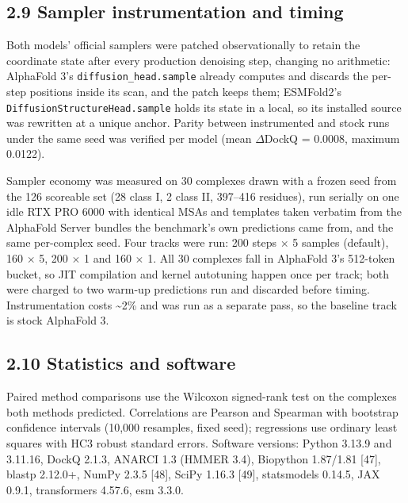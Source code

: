 \documentclass[
  11pt,
]{article}
\begin{document}
\subsection{2.9 Sampler instrumentation and
timing}\label{sampler-instrumentation-and-timing}

Both models' official samplers were patched observationally to retain
the coordinate state after every production denoising step, changing no
arithmetic: AlphaFold 3's \texttt{diffusion\_head.sample} already
computes and discards the per-step positions inside its scan, and the
patch keeps them; ESMFold2's \texttt{DiffusionStructureHead.sample}
holds its state in a local, so its installed source was rewritten at a
unique anchor. Parity between instrumented and stock runs under the same
seed was verified per model (mean \textbar \ensuremath{\Delta}DockQ\textbar{} = 0.0008,
maximum 0.0122).

Sampler economy was measured on 30 complexes drawn with a frozen seed
from the 126 scoreable set (28 class I, 2 class II, 397--416 residues),
run serially on one idle RTX PRO 6000 with identical MSAs and templates
taken verbatim from the AlphaFold Server bundles the benchmark's own
predictions came from, and the same per-complex seed. Four tracks were
run: 200 steps \ensuremath{\times} 5 samples (default), 160 \ensuremath{\times} 5, 200 \ensuremath{\times} 1 and 160 \ensuremath{\times} 1. All
30 complexes fall in AlphaFold 3's 512-token bucket, so JIT compilation
and kernel autotuning happen once per track; both were charged to two
warm-up predictions run and discarded before timing. Instrumentation
costs \textasciitilde2\% and was run as a separate pass, so the baseline
track is stock AlphaFold 3.

\subsection{2.10 Statistics and software}\label{statistics-and-software}

Paired method comparisons use the Wilcoxon signed-rank test on the
complexes both methods predicted. Correlations are Pearson and Spearman
with bootstrap confidence intervals (10,000 resamples, fixed seed);
regressions use ordinary least squares with HC3 robust standard errors.
Software versions: Python 3.13.9 and 3.11.16, DockQ 2.1.3, ANARCI 1.3
(HMMER 3.4), Biopython 1.87/1.81 {[}47{]}, blastp 2.12.0+, NumPy 2.3.5 {[}48{]}, SciPy
1.16.3 {[}49{]}, statsmodels 0.14.5, JAX 0.9.1, transformers 4.57.6, esm 3.3.0.
\end{document}
